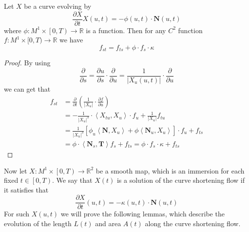 \begin{lemma}\label{lem:I-1-3}
    Let $X$ be a curve evolving by
    \begin{equation}
        \frac{\partial X}{\partial t}X(u,t)=-\phi(u,t)\cdot\mathbf{N}(u,t)
    \end{equation}
    where $\phi:M^1\times\left[0,T\right)\to\mathbb{R}$ is a function. Then for any $C^2$ function $f:M^1\times [0,T)\to\mathbb{R}$ we have
    \begin{equation}\label{eq:I-1-5}
        f_{st}=f_{ts}+\phi\cdot f_s\cdot\kappa
    \end{equation}
\end{lemma}
\begin{proof}
    By using
    \begin{equation*}
        \frac{\partial}{\partial s}=\frac{\partial u}{\partial s}\cdot\frac{\partial}{\partial u}=\frac{1}{\left|X_u (u,t)\right|}\cdot\frac{\partial}{\partial u}
    \end{equation*}
    we can get that
    \begin{align*}
        f_{st}&=\frac{\partial}{\partial t}\left(\frac{1}{\left|X_u\right|}\cdot\frac{\partial f}{\partial u}\right)\\
        &=-\frac{1}{{\left|X_u\right|}^3}\cdot\left<X_{tu},X_u\right>\cdot f_u+\frac{1}{\left|X_u\right|}f_{tu}\\
        &=\frac{1}{{\left|X_u\right|}^3}\left[\phi_u\left<\mathbf{N},X_u\right>+\phi\left<\mathbf{N}_u,X_u\right>\right]\cdot f_u+f_{ts}\\
        &=\phi\cdot\left<\mathbf{N}_s,\mathbf{T}\right>f_s+f_{ts}=\phi\cdot f_s\cdot\kappa+f_{ts}
    \end{align*}
\end{proof}

Now let $X:M^1\times\left[0,T\right)\to\mathbb{R}^2$ be a smooth map, which is an immersion for each fixed $t\in\left[0,T\right)$. We say that $X(t)$ is a solution of the curve shortening flow if it satisfies that
\begin{equation}\label{eq:I-1-2}
    \frac{\partial X}{\partial t}(u,t)=-\kappa(u,t)\cdot\mathbf{N}(u,t)
\end{equation}
For such $X(u,t)$ we will prove the following lemmas, which describe the evolution of the length $L(t)$ and area $A(t)$ along the curve shortening flow.

